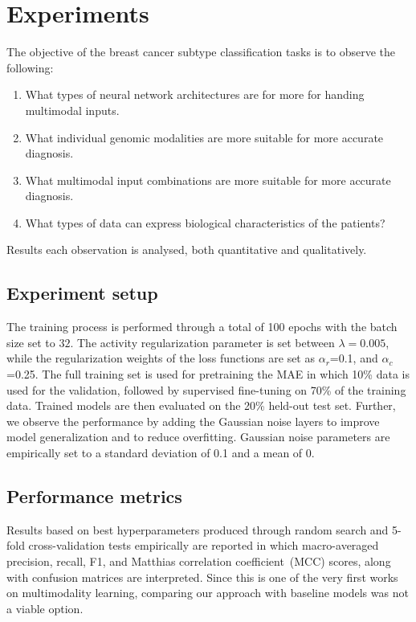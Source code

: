 \section{Experiments}\label{chapter_4:results}
The objective of the breast cancer subtype classification tasks is to observe the following:

\begin{enumerate}[noitemsep]
    \item What types of neural network architectures are for more for handing multimodal inputs. 
    \item What individual genomic modalities are more suitable for more accurate diagnosis. 
    \item What multimodal input combinations are more suitable for more accurate diagnosis.
    \item What types of data can express biological characteristics of the patients? 
\end{enumerate}

\hspace*{3.5mm} Results each observation is analysed, both quantitative and qualitatively. 

\subsection{Experiment setup}
The training process is performed through a total of 100 epochs with the batch size set to $32$. The activity regularization parameter is set between $\lambda=0.005$, while the regularization weights of the loss functions are set as $\alpha_{r}$=0.1, and $\alpha_{c}$=0.25. The full training set is used for pretraining the MAE in which 10\% data is used for the validation, followed by supervised fine-tuning on 70\% of the training data. Trained models are then evaluated on the 20\% held-out test set. Further, we observe the performance by adding the Gaussian noise layers to improve model generalization and to reduce overfitting. Gaussian noise parameters are empirically set to a standard deviation of 0.1 and a mean of 0. 

\subsection{Performance metrics}
Results based on best hyperparameters produced through random search and 5-fold cross-validation tests empirically are reported in which macro-averaged precision, recall, F1, and Matthias correlation coefficient~(MCC) scores, along with confusion matrices are interpreted. Since this is one of the very first works on multimodality learning, comparing our approach with baseline models was not a viable option. 

